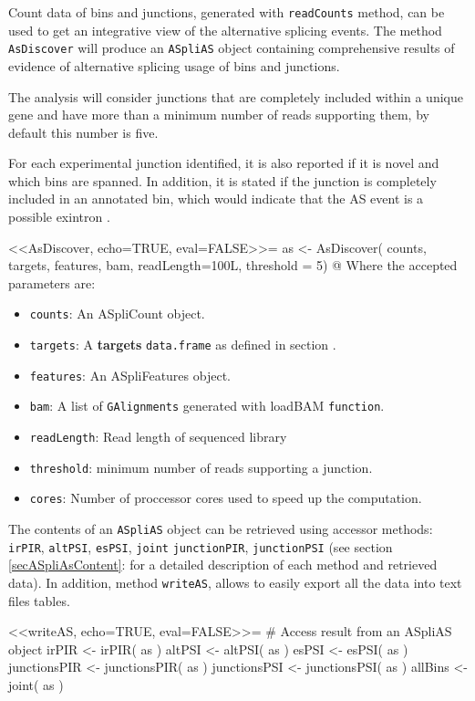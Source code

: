 \documentclass{article}
\newcommand{\secref}[1]{\ref{#1}:\nameref{#1}}
\begin{document}
Count data of bins and junctions, generated with \texttt{readCounts} method, can
be used to get an integrative view of the alternative splicing events. The 
method \texttt{AsDiscover} will produce an \texttt{ASpliAS} object containing
comprehensive results of evidence of alternative splicing usage of bins and
junctions. 

The analysis will consider junctions that are completely included within a
unique gene and have more than a minimum number of reads supporting them, by
default this number is five.

For each experimental junction identified, it is also reported if it is novel
and which bins are spanned. In addition, it is stated if the junction is completely
included in an annotated bin, which would indicate that the AS event is a
possible exintron \cite{pmid25934563}.

<<AsDiscover, echo=TRUE, eval=FALSE>>=
as <- AsDiscover( counts, targets, features, bam, readLength=100L, threshold =
5)
@
Where the accepted parameters are:
\begin{itemize}
  \item \texttt{counts}: An ASpliCount object.
  \item \texttt{targets}: A \textbf{targets} \texttt{data.frame} as defined in
section .  
  \item \texttt{features}: An ASpliFeatures object. 
  \item \texttt{bam}: A list of \texttt{GAlignments} generated with loadBAM
\texttt{function}.
  \item \texttt{readLength}: Read length of sequenced library 
  \item \texttt{threshold}: minimum number of reads supporting a junction.
  \item \texttt{cores}: Number of proccessor cores used to speed up the
computation.
\end{itemize}

The contents of an \texttt{ASpliAS} object can be retrieved using accessor
methods: \texttt{irPIR}, \texttt{altPSI}, \texttt{esPSI},
\texttt{joint} \texttt{junctionPIR}, \texttt{junctionPSI} (see section
\secref{secASpliAsContent} for a detailed description of each method and retrieved data). In addition, method
\texttt{writeAS}, allows to easily export all the data into text files tables.


<<writeAS, echo=TRUE, eval=FALSE>>=
# Access result from an ASpliAS object 
irPIR  <- irPIR( as )
altPSI <- altPSI( as )
esPSI  <- esPSI( as )
junctionsPIR <- junctionsPIR( as )
junctionsPSI <- junctionsPSI( as )
allBins      <- joint( as )
\end{document}
